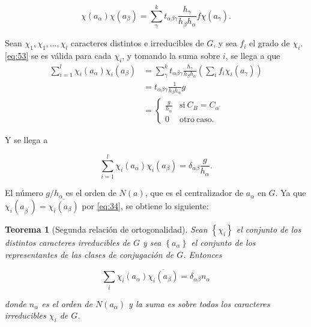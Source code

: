 \documentclass[12pt]{book}
\newtheorem{theorem}{Teorema}[section]
\theoremstyle{definition}
\newcounter{in}
\begin{document}
\begin{equation}
  \label{eq:53}
   \chi(a_{\alpha}) \chi(a_{\beta}) = \sum_{\gamma}^{k} t_{\alpha \beta \gamma} \frac{h_{\gamma}}{h_{\beta} h_{\alpha}} f \chi(a_{\gamma}).
\end{equation}

Sean $\chi_{1}, \chi_{1},..., \chi_{l}$ caracteres distintos e
irreducibles de $G$, y sea $f_{i}$ el grado de $\chi_{i}$. \ref{eq:53}
se es válida para cada $\chi_{i}$, y tomando la suma sobre $i$, se
llega a que
\begin{equation}
  \label{eq:54}
  \begin{aligned}
    \sum_{i=1}^{l} \chi_{i}(a_{\alpha}) \chi_{i}(a_{\beta}) &= \sum_{\gamma}^{k} t_{\alpha \beta \gamma} \frac{h_{\gamma}}{h_{\beta} h_{\alpha}} (\sum_{i} f_{i} \chi_{i}(a_{\gamma})) \\
    &= t_{\alpha \beta \gamma} \frac{1}{h_{\beta} h_{\alpha}}g \\
    &=  \left\{
	       \begin{array}{ll}
		 \frac{g}{h_{\alpha}}      & \mathrm{si\ } C_{B} = C_{\alpha^{'}} \\
		 0      & \mathrm{otro\ caso.\ } 
	       \end{array}
	     \right.
    \end{aligned}
\end{equation}

Y se llega a

\begin{equation}
  \label{eq:55}
   \sum_{i=1}^{l} \chi_{i}(a_{\alpha}) \chi_{i}(a_{\beta})=\delta_{\alpha \beta} \frac{g}{h_{\alpha}}.
\end{equation}

El número $g/h_{\alpha}$ es el orden de $N(a)$, que es el
centralizador de $a_{\alpha}$ en $G$. Ya que
$\chi_{i}(a_{\beta^{'}})=\overline{\chi_{i} (a_{\beta})}$ por
\ref{eq:34}, se obtiene lo siguiente:

\begin{theorem}[Segunda relación de ortogonalidad]
  \label{t4_9}
  Sean $\left\{\chi_{i} \right\}$ el conjunto de los distintos
  caracteres irreducibles de $G$ y sea $\left\{a_{\alpha} \right\}$ el
  conjunto de los representantes de las clases de conjugación de
  $G$. Entonces

\begin{equation*}
  \sum_{i} \chi_{i}(a_{\alpha}) \overline{\chi_{i} (a_{\beta})} = \delta_{\alpha \beta} n_{\alpha}
\end{equation*}

donde $n_{\alpha}$ es el orden de $N(a_{\alpha})$ y la suma es sobre
todos los caracteres irreducibles $\chi_{i}$ de $G$.
\end{theorem}
\end{document}
